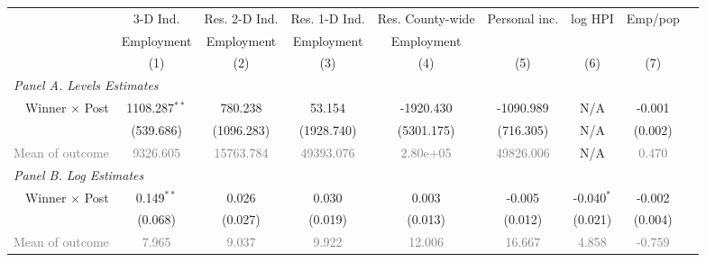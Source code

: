 \begin{tabular}{r*{8}{c}}
\toprule
 & 3-D Ind. & Res. 2-D Ind. & Res. 1-D Ind.         & Res. County-wide & Personal inc. & log HPI & Emp/pop\\
 & Employment & Employment & Employment         & Employment &  &  & \\
&(1)&(2)&(3)&(4)&(5)&(6)&(7)\\
  \midrule 
\multicolumn{8}{l}{\textit{Panel A. Levels Estimates}}\\
Winner $ \times$ Post &1108.287$ ^{**}$ &780.238&53.154&-1920.430&-1090.989&N/A&-0.001\\
&(539.686)&(1096.283)&(1928.740)&(5301.175)&(716.305)&N/A&(0.002)\\
 \textcolor{gray}{Mean of outcome} & \textcolor{gray}{ 9326.605}& \textcolor{gray}{ 15763.784}& \textcolor{gray}{ 49393.076}& \textcolor{gray}{ 2.80e+05}& \textcolor{gray}{ 49826.006}&N/A& \textcolor{gray}{ 0.470}\\
  \midrule 
\multicolumn{8}{l}{\textit{Panel B. Log Estimates}}\\
Winner $ \times$ Post &0.149$ ^{**}$ &0.026&0.030&0.003&-0.005&-0.040$ ^{*}$ &-0.002\\
&(0.068)&(0.027)&(0.019)&(0.013)&(0.012)&(0.021)&(0.004)\\
 \textcolor{gray}{Mean of outcome} & \textcolor{gray}{ 7.965}& \textcolor{gray}{ 9.037}& \textcolor{gray}{ 9.922}& \textcolor{gray}{ 12.006}& \textcolor{gray}{ 16.667}& \textcolor{gray}{ 4.858}& \textcolor{gray}{ -0.759}\\
  \bottomrule
\end{tabular}
